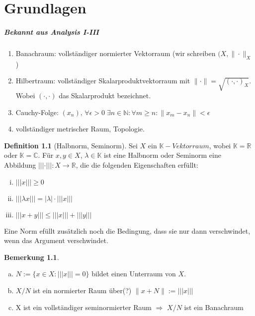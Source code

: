 \documentclass[ngerman]{report}
\theoremstyle{definition}%
\newtheorem{definition}[section]{Definition}
\theoremstyle{myStyle}
\newtheorem{bem}[section]{Bemerkung}
\theoremstyle{plain}%
\newcommand{\C}{\mathbb{C}}
\newcommand{\R}{\mathbb{R}}
\newcommand{\N}{\mathbb{N}}
\newcommand{\K}{\mathbb{K}}
\newcommand{\seminorm}[1]{||| #1 |||}
\newcommand{\norm}[1]{\|#1\|}
\begin{document}
\chapter{Grundlagen}

\paragraph{Bekannt aus Analysis I-III}

\begin{enumerate}[-]
	\item Banachraum: vollständiger normierter Vektorraum (wir schreiben $(X,\norm{\cdot }_X$) 
	\item Hilbertraum: vollständiger Skalarproduktvektorraum mit $\norm{\cdot } = \sqrt{(\cdot , \cdot )_X}$.  Wobei $(\cdot , \cdot )$ das Skalarprodukt bezeichnet.
	\item Cauchy-Folge: 
					$(x_n),\,  \forall \epsilon > 0\; \exists n \in \N : \forall m \geq n : \norm{x_m-x_n}<\epsilon$
	\item vollständiger metrischer Raum, Topologie.
\end{enumerate}

\begin{definition}[Halbnorm, Seminorm]

	Sei $X$ ein $\K-Vektorraum$, wobei $\K = \R$ oder $\K = \C$. 
	Für $x,y\in X$, $\lambda \in \K$ ist eine Halbnorm oder Seminorm eine Abbildung
	$\seminorm{\cdot}:X \rightarrow \R$, die die folgenden Eigenschaften erfüllt:

		\begin{enumerate}[(i)]
			\item $\seminorm{x}\geq 0$
			\item $\seminorm{\lambda x} = |\lambda|\cdot \seminorm{x}$
			\item $\seminorm{x+y} \leq \seminorm{x} + \seminorm{y}$
		\end{enumerate}
\end{definition}

Eine Norm efüllt zusätzlich noch die Bedingung, dass sie nur dann verschwindet, wenn das Argument verschwindet.

\begin{bem}
	\begin{enumerate}[(a)]
		\item $N:=\{x\in X: \seminorm{x}=0\}$ bildet einen Unterraum von $X$.
		\item $X/N$ ist ein normierter Raum über(?) $\norm{x+N} := \seminorm{x}$
		\item X ist ein vollständiger seminormierter Raum $\Rightarrow$ $X/N$ ist ein Banachraum 
	\end{enumerate}
\end{bem}
\end{document}
